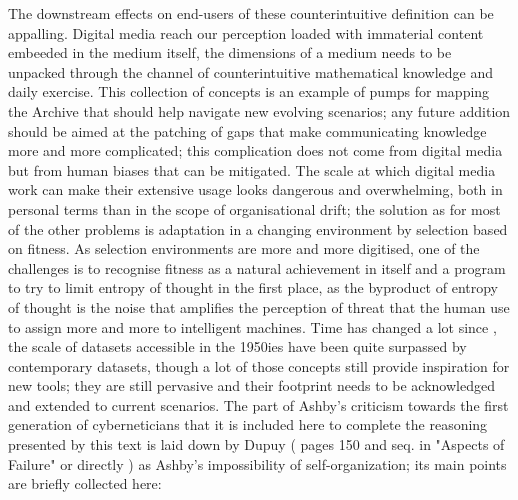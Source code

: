 \documentclass[14pt,a4paper]{extarticle}
\begin{document}
\hspace*{15mm}The downstream effects on end-users of these counterintuitive definition can be appalling. Digital media reach our perception loaded with immaterial content embeeded in the medium itself, the dimensions of a medium needs to be unpacked through the channel of counterintuitive mathematical knowledge and daily exercise. This collection of concepts is an example of pumps for mapping the Archive that should help navigate new evolving scenarios; any future addition should be aimed at the patching of gaps that make communicating knowledge more and more complicated; this complication does not come from digital media but from human biases that can be mitigated. The scale at which digital media work can make their extensive usage looks dangerous and overwhelming, both in personal terms than in the scope of organisational drift; the solution as for most of the other problems is adaptation in a changing environment by selection based on fitness. As selection environments are more and more digitised, one of the challenges is to recognise fitness as a natural achievement in itself and a program to try to limit entropy of thought in the first place, as the byproduct of entropy of thought is the noise that amplifies the perception of threat that the human use to assign more and more to intelligent machines.
\newline
\hspace*{15mm}Time has changed a lot since \cite{ashby2014design}, the scale of datasets accessible in the 1950ies have been quite surpassed by contemporary datasets, though a lot of those concepts still provide inspiration for new tools; they are still pervasive and their footprint needs to be acknowledged and extended to current scenarios. The part of Ashby's criticism towards the first generation of cyberneticians that it is included here to complete the reasoning presented by this text is laid down by Dupuy (\cite{DUPUYmechanization} pages 150 and seq. in "Aspects of Failure" or directly \cite{ashby1991principles}) as Ashby's impossibility of self-organization; its main points are briefly collected here:
\end{document}
